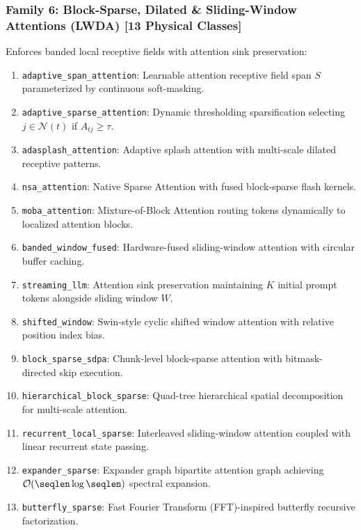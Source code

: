 \subsubsection{Family 6: Block-Sparse, Dilated \& Sliding-Window Attentions (LWDA) [13 Physical Classes]}
Enforces banded local receptive fields with attention sink preservation:
\begin{enumerate}
    \item \texttt{adaptive\_span\_attention}: Learnable attention receptive field span $S$ parameterized by continuous soft-masking.
    \item \texttt{adaptive\_sparse\_attention}: Dynamic thresholding sparsification selecting $j \in \mathcal{N}(t)$ if $A_{tj} \ge \tau$.
    \item \texttt{adasplash\_attention}: Adaptive splash attention with multi-scale dilated receptive patterns.
    \item \texttt{nsa\_attention}: Native Sparse Attention with fused block-sparse flash kernels.
    \item \texttt{moba\_attention}: Mixture-of-Block Attention routing tokens dynamically to localized attention blocks.
    \item \texttt{banded\_window\_fused}: Hardware-fused sliding-window attention with circular buffer caching.
    \item \texttt{streaming\_llm}: Attention sink preservation maintaining $K$ initial prompt tokens alongside sliding window $W$.
    \item \texttt{shifted\_window}: Swin-style cyclic shifted window attention with relative position index bias.
    \item \texttt{block\_sparse\_sdpa}: Chunk-level block-sparse attention with bitmask-directed skip execution.
    \item \texttt{hierarchical\_block\_sparse}: Quad-tree hierarchical spatial decomposition for multi-scale attention.
    \item \texttt{recurrent\_local\_sparse}: Interleaved sliding-window attention coupled with linear recurrent state passing.
    \item \texttt{expander\_sparse}: Expander graph bipartite attention graph achieving $\mathcal{O}(\seqlen \log \seqlen)$ spectral expansion.
    \item \texttt{butterfly\_sparse}: Fast Fourier Transform (FFT)-inspired butterfly recursive factorization.
\end{enumerate}

